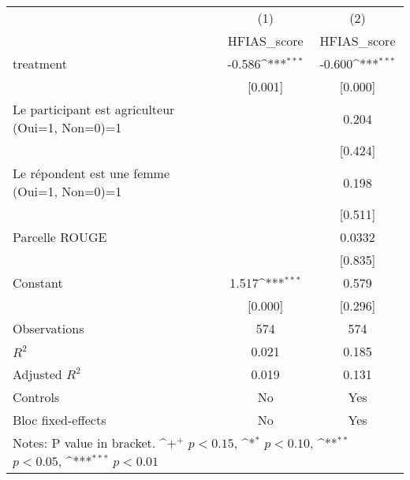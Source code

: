 {
\def\sym#1{\ifmmode^{#1}\else\(^{#1}\)\fi}
\begin{tabular*}{1.2\hsize}{@{\hskip\tabcolsep\extracolsep\fill}l*{2}{c}}
\cline{2-3}\cline{2-3}
     &\multicolumn{1}{c}{(1)}&\multicolumn{1}{c}{(2)}\\
     &\multicolumn{1}{c}{HFIAS\_score}&\multicolumn{1}{c}{HFIAS\_score}\\
\cline{2-3}
treatment&-0.586\sym{***}&-0.600\sym{***}\\
     &[0.001]         &[0.000]         \\
[1em]
Le participant est agriculteur (Oui=1, Non=0)=1&           &0.204         \\
     &           &[0.424]         \\
[1em]
Le répondent est une femme (Oui=1, Non=0)=1&           &0.198         \\
     &           &[0.511]         \\
[1em]
Parcelle ROUGE&           &0.0332         \\
     &           &[0.835]         \\
[1em]
Constant&1.517\sym{***}&0.579         \\
     &[0.000]         &[0.296]         \\
\cline{2-3}
Observations&574         &574         \\
\(R^{2}\)&0.021         &0.185         \\
Adjusted \(R^{2}\)&0.019         &0.131         \\
Controls&No         &Yes         \\
Bloc fixed-effects&No         &Yes         \\
\cline{2-3}\cline{2-3}
\multicolumn{3}{p{1.0\textwidth}}{\footnotesize Notes: P value in bracket. \sym{+} \(p<0.15\), \sym{*} \(p<0.10\), \sym{**} \(p<0.05\), \sym{***} \(p<0.01\)}\\
\end{tabular*}
}
